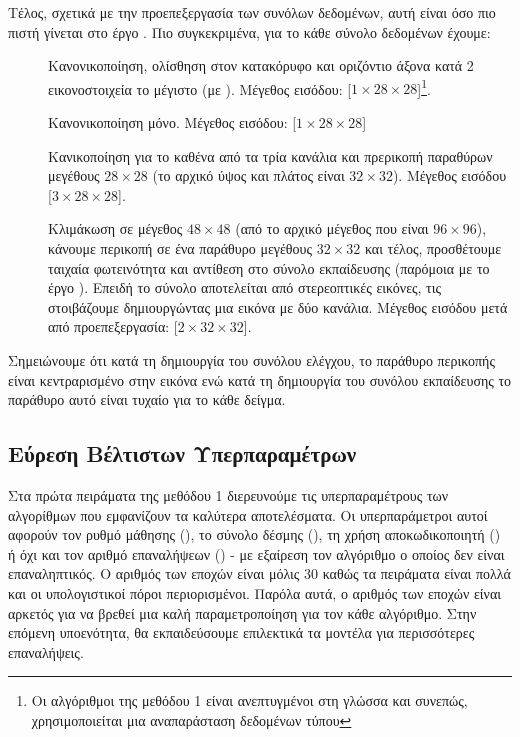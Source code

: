 Τέλος, σχετικά με την προεπεξεργασία των συνόλων δεδομένων, αυτή είναι όσο πιο πιστή γίνεται στο έργο \cite{sabour2017dynamic}. Πιο συγκεκριμένα, για το κάθε σύνολο δεδομένων έχουμε:
\begin{description}
    \item[] Κανονικοποίηση, ολίσθηση στον κατακόρυφο και οριζόντιο άξονα κατά 2 εικονοστοιχεία το μέγιστο (με ). Μέγεθος εισόδου: [$1 \times 28 \times 28$]\footnote{Οι αλγόριθμοι της μεθόδου 1 είναι ανεπτυγμένοι στη γλώσσα  και συνεπώς, χρησιμοποιείται μια αναπαράσταση δεδομένων τύπου }.
    \item[] Κανονικοποίηση μόνο. Μέγεθος εισόδου: [$1 \times 28 \times 28$]
    \item[] Κανικοποίηση για το καθένα από τα τρία κανάλια και πρερικοπή παραθύρων μεγέθους $28 \times 28$ (το αρχικό ύψος και πλάτος είναι $32 \times 32$). Μέγεθος εισόδου [$3 \times 28 \times 28$].
    \item[] Κλιμάκωση σε μέγεθος $48 \times 48$ (από το αρχικό μέγεθος που είναι $96 \times 96$), κάνουμε περικοπή σε ένα παράθυρο μεγέθους $32 \times 32$ και τέλος, προσθέτουμε ταιχαία φωτεινότητα και αντίθεση στο σύνολο εκπαίδευσης (παρόμοια με το έργο \cite{hinton2018matrix}). Επειδή το σύνολο αποτελείται από στερεοπτικές εικόνες, τις στοιβάζουμε δημιουργώντας μια εικόνα με δύο κανάλια. Μέγεθος εισόδου μετά από προεπεξεργασία: [$2 \times 32 \times 32$].
\end{description} 
Σημειώνουμε ότι κατά τη δημιουργία του συνόλου ελέγχου, το παράθυρο περικοπής είναι κεντραρισμένο στην εικόνα ενώ κατά τη δημιουργία του συνόλου εκπαίδευσης το παράθυρο αυτό είναι τυχαίο για το κάθε δείγμα.

\subsection{Εύρεση Βέλτιστων Υπερπαραμέτρων}

Στα πρώτα πειράματα της μεθόδου 1 διερευνούμε τις υπερπαραμέτρους των αλγορίθμων που εμφανίζουν τα καλύτερα αποτελέσματα. Οι υπερπαράμετροι αυτοί αφορούν τον ρυθμό μάθησης (), το σύνολο δέσμης (), τη χρήση αποκωδικοποιητή () ή όχι και τον αριθμό επαναλήψεων () - με εξαίρεση τον αλγόριθμο  ο οποίος δεν είναι επαναληπτικός. Ο αριθμός των εποχών είναι μόλις 30 καθώς τα πειράματα είναι πολλά και οι υπολογιστικοί πόροι περιορισμένοι. Παρόλα αυτά, ο αριθμός των εποχών είναι αρκετός για να βρεθεί μια καλή παραμετροποίηση για τον κάθε αλγόριθμο. Στην επόμενη υποενότητα, θα εκπαιδεύσουμε επιλεκτικά τα μοντέλα για περισσότερες επαναλήψεις. 

